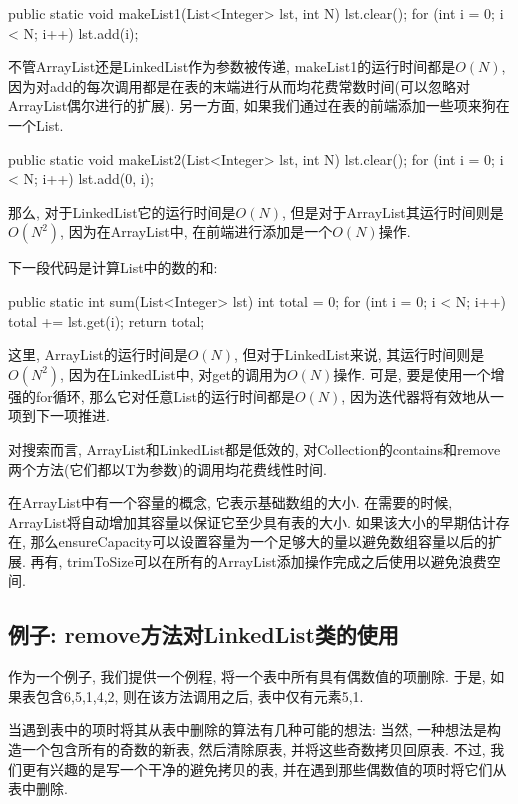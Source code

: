 \documentclass[oneside]{ctexbook}
\begin{document}
\begin{myjava}{}{}
public static void makeList1(List<Integer> lst, int N) {
    lst.clear();
    for (int i = 0; i < N; i++)
        lst.add(i);
}
\end{myjava}

不管ArrayList还是LinkedList作为参数被传递, makeList1的运行时间都是$O(N)$, 因为对add的每次调用都是在表的末端进行从而均花费常数时间(可以忽略对ArrayList偶尔进行的扩展). 另一方面, 如果我们通过在表的前端添加一些项来狗在一个List.

\begin{myjava}{}{}
public static void makeList2(List<Integer> lst, int N) {
    lst.clear();
    for (int i = 0; i < N; i++)
        lst.add(0, i);
}
\end{myjava}

那么, 对于LinkedList它的运行时间是$O(N)$, 但是对于ArrayList其运行时间则是$O(N^2)$, 因为在ArrayList中, 在前端进行添加是一个$O(N)$操作.

下一段代码是计算List中的数的和:

\begin{myjava}{}{}
public static int sum(List<Integer> lst) {
    int total = 0;
    for (int i = 0; i < N; i++)
        total += lst.get(i);
    return total;
}
\end{myjava}

这里, ArrayList的运行时间是$O(N)$, 但对于LinkedList来说, 其运行时间则是$O(N^2)$, 因为在LinkedList中, 对get的调用为$O(N)$操作. 可是, 要是使用一个增强的for循环, 那么它对任意List的运行时间都是$O(N)$, 因为迭代器将有效地从一项到下一项推进.

对搜索而言, ArrayList和LinkedList都是低效的, 对Collection的contains和remove两个方法(它们都以T为参数)的调用均花费线性时间.

在ArrayList中有一个容量的概念, 它表示基础数组的大小. 在需要的时候, ArrayList将自动增加其容量以保证它至少具有表的大小. 如果该大小的早期估计存在, 那么ensureCapacity可以设置容量为一个足够大的量以避免数组容量以后的扩展. 再有, trimToSize可以在所有的ArrayList添加操作完成之后使用以避免浪费空间.

\subsection{例子: remove方法对LinkedList类的使用}

作为一个例子, 我们提供一个例程, 将一个表中所有具有偶数值的项删除. 于是, 如果表包含6,5,1,4,2, 则在该方法调用之后, 表中仅有元素5,1.

当遇到表中的项时将其从表中删除的算法有几种可能的想法: 当然, 一种想法是构造一个包含所有的奇数的新表, 然后清除原表, 并将这些奇数拷贝回原表. 不过, 我们更有兴趣的是写一个干净的避免拷贝的表, 并在遇到那些偶数值的项时将它们从表中删除.
\end{document}
